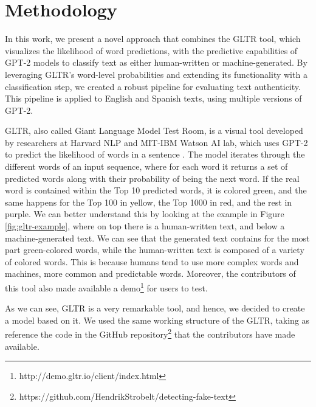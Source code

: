 \documentclass[a4paper,11pt,twocolumn,twoside]{article}
\begin{document}

\section{Methodology}

In this work, we present a novel approach that combines the GLTR tool, which visualizes the likelihood of word predictions, with the predictive capabilities of GPT-2 models to classify text as either human-written or machine-generated. By leveraging GLTR's word-level probabilities and extending its functionality with a classification step, we created a robust pipeline for evaluating text authenticity. This pipeline is applied to English and Spanish texts, using multiple versions of GPT-2.

GLTR, also called Giant Language Model Test Room, is a visual tool developed by researchers at Harvard NLP and MIT-IBM Watson AI lab, which uses GPT-2 to predict the likelihood of words in a sentence \cite{DBLP:journals/corr/abs-1906-04043}. The model iterates through the different words of an input sequence, where for each word it returns a set of predicted words along with their probability of being the next word. If the real word is contained within the Top 10 predicted words, it is colored green, and the same happens for the Top 100 in yellow, the Top 1000 in red, and the rest in purple. We can better understand this by looking at the example in Figure \ref{fig:gltr-example}, where on top there is a human-written text, and below a machine-generated text. We can see that the generated text contains for the most part green-colored words, while the human-written text is composed of a variety of colored words. This is because humans tend to use more complex words and machines, more common and predictable words. Moreover, the contributors of this tool also made available a demo\footnote{http://demo.gltr.io/client/index.html} for users to test.

As we can see, GLTR is a very remarkable tool, and hence, we decided to create a model based on it. We used the same working structure of the GLTR, taking as reference the code in the GitHub repository\footnote{https://github.com/HendrikStrobelt/detecting-fake-text} that the contributors have made available. 
\end{document}
